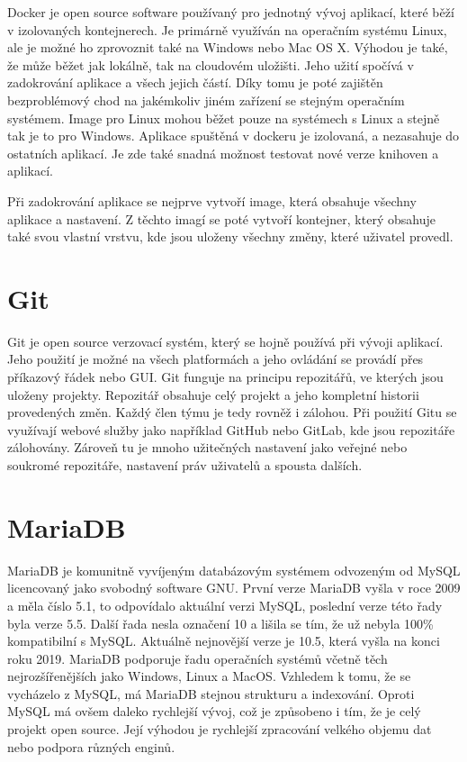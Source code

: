 Docker je open source software používaný pro jednotný vývoj aplikací,
které běží v izolovaných kontejnerech. Je primárně využíván na
operačním systému Linux, ale je možné ho zprovoznit také na Windows
nebo Mac OS X. Výhodou je také, že může běžet jak lokálně, tak na
cloudovém uložišti. Jeho užití spočívá v zadokrování aplikace a všech
jejich částí. Díky tomu je poté zajištěn bezproblémový chod na
jakémkoliv jiném zařízení se stejným operačním systémem. Image pro
Linux mohou běžet pouze na systémech s Linux a stejně tak je to pro
Windows. Aplikace spuštěná v dockeru je izolovaná, a nezasahuje do
ostatních aplikací. Je zde také snadná možnost testovat nové verze
knihoven a aplikací.

Při zadokrování aplikace se nejprve vytvoří image, která obsahuje
všechny aplikace a nastavení. Z těchto imagí se poté vytvoří
kontejner, který obsahuje také svou vlastní vrstvu, kde jsou uloženy
všechny změny, které uživatel provedl.



\section{Git}

Git je open source verzovací systém, který se hojně používá při vývoji
aplikací. Jeho použití je možné na všech platformách a jeho ovládání
se provádí přes příkazový řádek nebo GUI. Git funguje na principu
repozitářů, ve kterých jsou uloženy projekty. Repozitář obsahuje celý
projekt a jeho kompletní historii provedených změn. Každý člen týmu je
tedy rovněž i zálohou. Při použití Gitu se využívají webové služby
jako například GitHub nebo GitLab, kde jsou repozitáře
zálohovány. Zároveň tu je mnoho užitečných nastavení jako veřejné nebo
soukromé repozitáře, nastavení práv uživatelů a spousta dalších.

\newpage

\section{MariaDB}

MariaDB je komunitně vyvíjeným databázovým systémem odvozeným od MySQL
licencovaný jako svobodný software GNU. První verze MariaDB vyšla v
roce 2009 a měla číslo 5.1, to odpovídalo aktuální verzi MySQL,
poslední verze této řady byla verze 5.5. Další řada nesla označení 10
a lišila se tím, že už nebyla 100\% kompatibilní s MySQL. Aktuálně
nejnovější verze je 10.5, která vyšla na konci roku 2019. MariaDB
podporuje řadu operačních systémů včetně těch nejrozšířenějších jako
Windows, Linux a MacOS. Vzhledem k tomu, že se vycházelo z MySQL, má
MariaDB stejnou strukturu a indexování. Oproti MySQL má ovšem daleko
rychlejší vývoj, což je způsobeno i tím, že je celý projekt open
source. Její výhodou je rychlejší zpracování velkého objemu dat nebo
podpora různých enginů.

